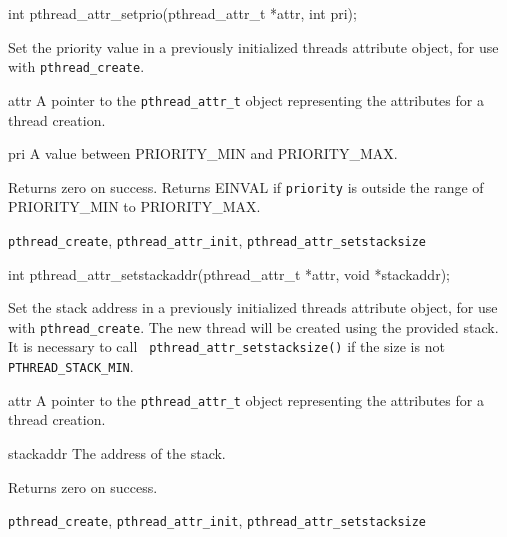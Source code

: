 \begin{apisyn}

	\funcproto int pthread_attr_setprio(pthread_attr_t *attr, int pri);
\end{apisyn}
\begin{apidesc}
	Set the priority value in a previously initialized threads
	attribute object, for use with {\tt pthread_create}. 
\end{apidesc}
\begin{apiparm}
	\item[attr]
		A pointer to the {\tt pthread_attr_t} object
		representing the attributes for a thread creation.
	\item[pri]
		A value between PRIORITY_MIN and PRIORITY_MAX.
\end{apiparm}
\begin{apiret}
	Returns zero on success. Returns EINVAL if {\tt priority} is
	outside the range of PRIORITY_MIN to PRIORITY_MAX.
\end{apiret}
\begin{apirel}
	{\tt pthread_create}, {\tt pthread_attr_init},
	{\tt pthread_attr_setstacksize}
\end{apirel}


\begin{apisyn}

	\funcproto int pthread_attr_setstackaddr(pthread_attr_t *attr,
                                                 void *stackaddr);
\end{apisyn}
\begin{apidesc}
	Set the stack address in a previously initialized threads attribute
	object, for use with {\tt pthread_create}. The new thread will be
	created using the provided stack. It is necessary to call {\tt
	pthread_attr_setstacksize()} if the size is not {\tt
	PTHREAD_STACK_MIN}.
\end{apidesc}
\begin{apiparm}
	\item[attr]
		A pointer to the {\tt pthread_attr_t} object
		representing the attributes for a thread creation.
	\item[stackaddr]
		The address of the stack.
\end{apiparm}
\begin{apiret}
	Returns zero on success. 
\end{apiret}
\begin{apirel}
	{\tt pthread_create}, {\tt pthread_attr_init},
        {\tt pthread_attr_setstacksize}
\end{apirel}


